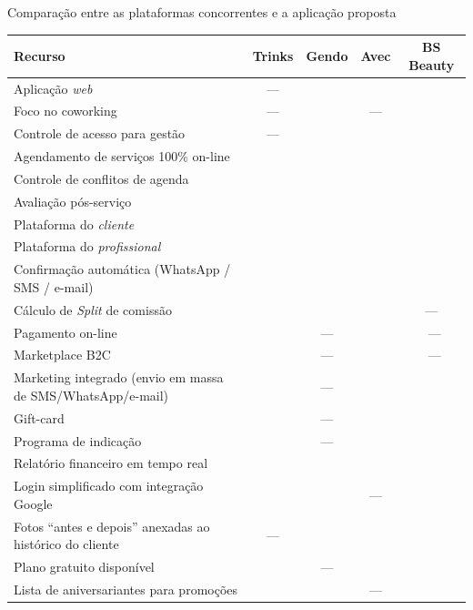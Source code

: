 \begin{quadro}[htb]
	\caption{\label{frame:comparativo_concorrência}Comparação entre as plataformas concorrentes e a aplicação proposta}
	\footnotesize
	\setlength{\tabcolsep}{4pt}
	\begin{tabular}{|p{6.8cm}|c|c|c|c|}
		\hline
		\textbf{Recurso}                                   & \textbf{Trinks} & \textbf{Gendo} & \textbf{Avec} & \textbf{BS Beauty}\\ \hline 
		Aplicação \textit{web}  & — & \checkmark & \checkmark & \checkmark \\ \hline
		Foco no coworking  & — & \checkmark & — & \checkmark \\ \hline
		Controle de acesso para gestão  & — & \checkmark  & \checkmark & \checkmark \\ \hline
		Agendamento de serviços 100\% on-line & \checkmark & \checkmark & \checkmark & \checkmark \\ \hline
		Controle de conflitos de agenda                    & \checkmark & \checkmark & \checkmark & \checkmark \\ \hline
		Avaliação pós-serviço  & \checkmark & \checkmark  & \checkmark  & \checkmark \\ \hline
		Plataforma do \textit{cliente}                               & \checkmark & \checkmark & \checkmark & \checkmark \\ \hline
		Plataforma do \textit{profissional}                                        & \checkmark & \checkmark & \checkmark & \checkmark \\ \hline
		Confirmação automática (WhatsApp / SMS / e-mail)                    & \checkmark & \checkmark & \checkmark & \checkmark \\ \hline
		Cálculo de \emph{Split} de comissão      & \checkmark & \checkmark & \checkmark & — \\ \hline
		Pagamento on-line                 & \checkmark & — & \checkmark & \ — \\ \hline
		Marketplace B2C                         & \checkmark & — & \checkmark & \ — \\ \hline
		Marketing integrado (envio em massa de SMS/WhatsApp/e-mail)  & \checkmark & — & \checkmark & \checkmark \\ \hline
		Gift-card                     & \checkmark & — & \checkmark & \checkmark \\ \hline
		Programa de indicação  & \checkmark & — & \checkmark & \checkmark \\ \hline
		Relatório financeiro em tempo real    & \checkmark & \checkmark & \checkmark & \checkmark \\ \hline
		Login simplificado com integração Google            & \checkmark & \checkmark &  — & \checkmark \\ \hline
		Fotos “antes e depois” anexadas ao histórico do cliente             & — & \checkmark & \checkmark & \checkmark \\ \hline
		Plano gratuito disponível                                           & \checkmark & — & \checkmark & \checkmark \\ \hline
		Lista de aniversariantes para promoções  & \checkmark & \checkmark & — & \checkmark \\ \hline
		

\end{tabular}
\end{quadro}
